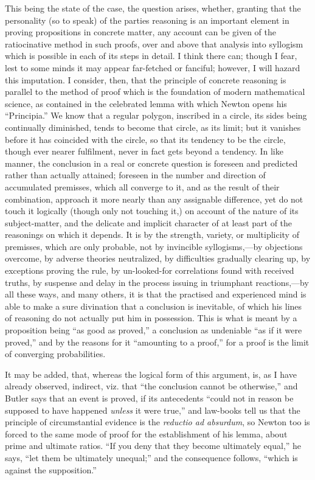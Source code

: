 This being the state of the case, the question arises, whether,
granting that the personality (so to speak) of the parties reasoning
is an important element in proving propositions in concrete matter,
any account can be given of the ratiocinative method in such proofs,
over and above that analysis into syllogism which is possible in each
of its steps in detail. I think there can; though I fear, lest to some
minds it may appear far-fetched or fanciful; however, I will hazard
this imputation. I consider, then, that the principle of concrete
reasoning is parallel to the method of proof which is the foundation
of modern mathematical science, as contained in the celebrated lemma
with which Newton opens his ``Principia.'' We know that a
regular polygon, inscribed in a circle, its sides being continually
diminished, tends to become that circle, as its limit; but it
vanishes before it has coincided with the circle, so that its tendency
to be the circle, though ever nearer fulfilment, never in fact gets
beyond a tendency. In like manner, the conclusion in a real or
concrete question is foreseen and predicted rather than actually
attained; foreseen in the number and direction of accumulated
premisses, which all converge to it, and as the result of their
combination, approach it more nearly than any assignable difference,
yet do not touch it logically (though only not touching it,) on
account of the nature of its subject-matter, and the delicate and
implicit character of at least part of the reasonings on which it
depends. It is by the strength, variety, or multiplicity of premisses,
which are only probable, not by invincible syllogisms,—by objections
overcome, by adverse theories neutralized, by difficulties gradually
clearing up, by exceptions proving the rule, by un-looked-for
correlations found with received truths, by suspense and delay in the
process issuing in triumphant reactions,—by all these ways, and many
others, it is that the practised and experienced mind is able to make
a sure divination that a conclusion is inevitable, of which his lines
of reasoning do not actually put him in possession. This is what is
meant by a proposition being ``as good as proved,'' a
conclusion as undeniable ``as if it were proved,'' and by the
reasons for it ``amounting to a proof,'' for a proof is the
limit of converging probabilities.

It may be added, that, whereas the logical form of this argument,
is, as I have already observed, indirect, viz. that ``the
conclusion cannot be otherwise,'' and Butler says that an event is
proved, if its antecedents ``could not in reason be supposed to
have happened \emph{unless} it were true,'' and law-books tell us that
the principle of circumstantial evidence is the \emph{reductio ad
absurdum}, so Newton too is forced to the same mode of proof for
the establishment of his lemma, about prime and ultimate ratios.
``If you deny that they become ultimately equal,'' he says,
``let them be ultimately unequal;'' and the consequence
follows, ``which is against the supposition.''

